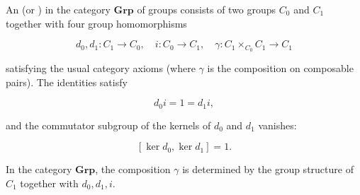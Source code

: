 An  (or ) in the category $\mathbf{Grp}$ of groups consists of two groups $C_0$ and $C_1$ together with four group homomorphisms

$$d_0, d_1 : C_1 \rightarrow C_0, \quad i : C_0 \rightarrow C_1, \quad \gamma : C_1 \times_{C_0} C_1 \rightarrow C_1$$

satisfying the usual category axioms (where $\gamma$ is the composition on composable pairs). The identities satisfy

$$d_0 i = 1 = d_1 i,$$

and the commutator subgroup of the kernels of $d_0$ and $d_1$ vanishes:

$$[\ker d_0, \ker d_1] = 1.$$

In the category $\mathbf{Grp}$, the composition $\gamma$ is determined by the group structure of $C_1$ together with $d_0, d_1, i$.
